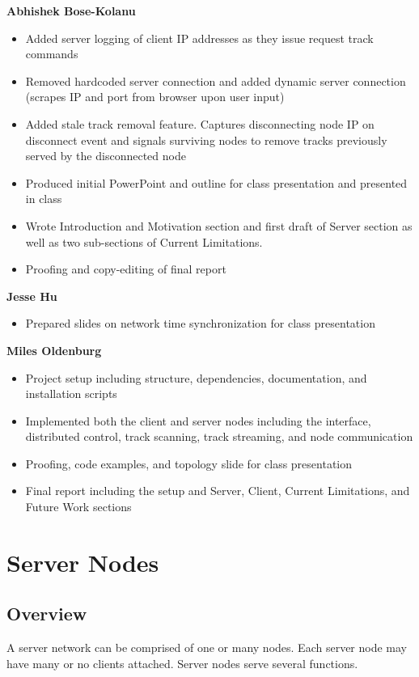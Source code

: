 \documentclass[12pt]{article}
\begin{document}
\textbf{Abhishek Bose-Kolanu}
\begin{itemize}
\item Added server logging of client IP addresses as they issue request track commands
\item Removed hardcoded server connection and added dynamic server connection (scrapes IP and port from browser upon user input)
\item Added stale track removal feature. Captures disconnecting node IP on disconnect event and signals surviving nodes to remove tracks previously served by the disconnected node
\item Produced initial PowerPoint and outline for class presentation and presented in class
\item Wrote Introduction and Motivation section and first draft of Server section as well as two sub-sections of Current Limitations.
\item Proofing and copy-editing of final report
\end{itemize}

\textbf{Jesse Hu}
\begin{itemize}
\item Prepared slides on network time synchronization for class presentation
\end{itemize}

\textbf{Miles Oldenburg}
\begin{itemize}
\item Project setup including structure, dependencies, documentation, and installation scripts
\item Implemented both the client and server nodes including the interface, distributed control, track scanning, track streaming, and node communication
\item Proofing, code examples, and topology slide for class presentation
\item Final report including the setup and Server, Client, Current Limitations, and Future Work sections
\end{itemize}

\section{Server Nodes}

\subsection{Overview}
A server network can be comprised of one or many nodes. Each server node may have many or no clients attached. Server nodes serve several functions.\\
\end{document}
